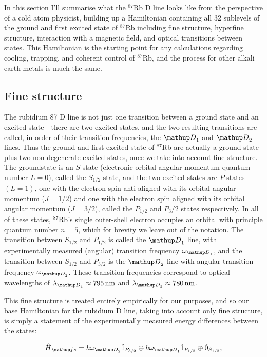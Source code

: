 In this section I'll summarise what the $^{87}$Rb D line looks like from the perspective of a cold atom physicist, building up a Hamiltonian containing all 32 sublevels of the ground and first excited state of $^{87}$Rb including fine structure, hyperfine structure, interaction with a magnetic field, and optical transitions between states. This Hamiltonian is the starting point for any calculations regarding cooling, trapping, and coherent control of $^{87}$Rb, and the process for other alkali earth metals is much the same.

\subsection{Fine structure}

The rubidium 87 D line is not just one transition between a ground state and an excited state---there are two excited states, and the two resulting transitions are called, in order of their transition frequencies, the $\up{D}_1$ and  $\up{D}_2$ lines. Thus the ground and first excited state of $^{87}$Rb are actually a ground state plus two non-degenerate excited states, once we take into account fine structure. The groundstate is an $S$ state (electronic orbital angular momentum quantum number $L=0$), called the $S_{1/2}$ state, and the two excited states are $P$ states $(L=1)$, one with the electron spin anti-aligned with its orbital angular momentum ($J=1/2$) and one with the electron spin aligned with its orbital angular momentum ($J=3/2$), called the $P_{1/2}$ and $P_3/2$ states respectively. In all of these states, $^{87}$Rb's single outer-shell electron occupies an orbital with principle quantum number $n=5$, which for brevity we leave out of the notation. The transition between $S_{1/2}$ and $P_{1/2}$ is called the $\up{D}_1$ line, with experimentally measured (angular) transition frequency $\omega_{\up{D}_1}$, and the transition between $S_{1/2}$ and $P_{3/2}$ is the $\up{D}_2$ line with angular transition frequency $\omega_{\up{D}_2}$. These transition frequencies correspond to optical wavelengths of $\lambda_{\up{D}_1} \approx 795\unit{nm}$ and $\lambda_{\up{D}_2} \approx 780\unit{nm}$\cite{steck_rubidium_2015}.

This fine structure is treated entirely empirically for our purposes, and so our base Hamiltonian for the rubidium D line, taking into account only fine structure, is simply a statement of the experimentally measured energy differences between the states:

\begin{align}
\hat H_\up{fs} = 
\hbar\omega_{\up{D}_2} \hat1_{P_{3/2}} \oplus
\hbar\omega_{\up{D}_1} \hat1_{P_{1/2}} \oplus
\hat 0_{S_{1/2}},
\end{align}

